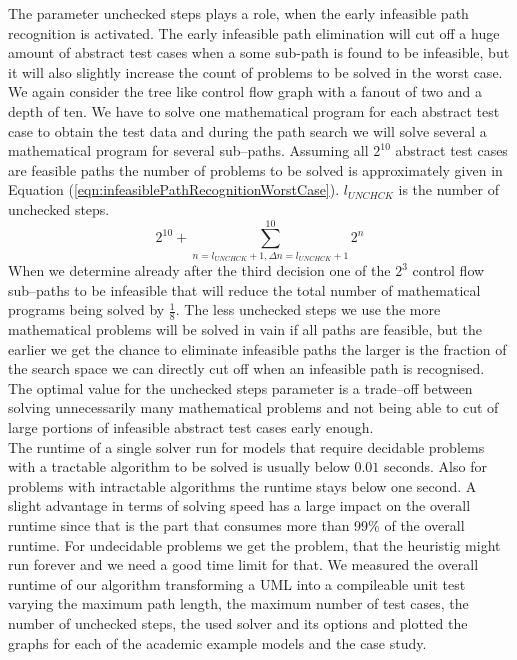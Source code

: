 The parameter unchecked steps plays a role, when the early infeasible path recognition is activated. The early infeasible path elimination will cut off a huge amount of abstract test cases when a some sub-path is found to be infeasible, but it will also slightly increase the count of problems to be solved in the worst case. We again consider the tree like control flow graph with a fanout of two and a depth of ten. We have to solve one mathematical program for each abstract test case to obtain the test data and during the path search we will solve several a mathematical program for several sub--paths. Assuming all $2^{10}$ abstract test cases are feasible paths the number of problems to be solved is approximately given in Equation (\ref{eqn:infeasiblePathRecognitionWorstCase}). $l_{UNCHCK}$ is the number of unchecked steps.
\begin{equation}
2^{10}+\sum_{n=l_{UNCHCK}+1, \Delta n=l_{UNCHCK}+1}^{10}{2^n}
\label{eqn:infeasiblePathRecognitionWorstCase}
\end{equation}
When we determine already after the third decision one of the $2^3$ control flow sub--paths to be infeasible that will reduce the total number of mathematical programs being solved by $\frac{1}{8}$. The less unchecked steps we use the more mathematical problems will be solved in vain if all paths are feasible, but the earlier we get the chance to eliminate infeasible paths the larger is the fraction of the search space we can directly cut off when an infeasible path is recognised. The optimal value for the unchecked steps parameter is a trade--off between solving unnecessarily many mathematical problems and not being able to cut of large portions of infeasible abstract test cases early enough.
\\
The runtime of a single solver run for models that require decidable problems with a tractable algorithm to be solved is usually below $0.01$ seconds. Also for problems with intractable algorithms the runtime stays below one second. A slight advantage in terms of solving speed has a large impact on the overall runtime since that is the part that consumes more than 99\% of the overall runtime. For undecidable problems we get the problem, that the heuristig might run forever and we need a good time limit for that. 
We measured the overall runtime of our algorithm transforming a UML  into a compileable unit test varying the maximum path length, the maximum number of test cases, the number of unchecked steps, the used solver and its options and plotted the graphs for each of the academic example models and the case study.
